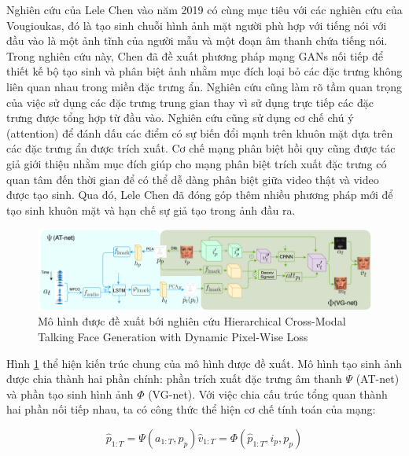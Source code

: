 Nghiên cứu của Lele Chen vào năm 2019 có cùng mục tiêu với các nghiên cứu của Vougioukas, đó là tạo sinh chuỗi hình ảnh mặt người phù hợp với tiếng nói với đầu vào là một ảnh tĩnh của người mẫu và một đoạn âm thanh chứa tiếng nói. Trong nghiên cứu này, Chen đã đề xuất phương pháp mạng GANs nối tiếp để thiết kế bộ tạo sinh và phân biệt ảnh nhằm mục đích loại bỏ các đặc trưng không liên quan nhau trong miền đặc trưng ẩn. Nghiên cứu cũng làm rõ tầm quan trọng của việc sử dụng các đặc trưng trung gian thay vì sử dụng trực tiếp các đặc trưng được tổng hợp từ đầu vào. Nghiên cứu cũng sử dụng cơ chế chú ý (attention) để đánh dấu các điểm có sự biến đổi mạnh trên khuôn mặt dựa trên các đặc trưng ẩn được trích xuất. Cơ chế mạng phân biệt hồi quy cũng được tác giả giới thiệu nhằm mục đích giúp cho mạng phân biệt trích xuất đặc trưng có quan tâm đến thời gian để có thể dễ dàng phân biệt giữa video thật và video được tạo sinh. Qua đó, Lele Chen đã đóng góp thêm nhiều phương pháp mới để tạo sinh khuôn mặt và hạn chế sự giả tạo trong ảnh đầu ra. 

\begin{figure}[H]
    \centering
    \includegraphics[width=15cm]{./content/images/chen2019_model.png}
    \caption{Mô hình được đề xuất bới nghiên cứu Hierarchical Cross-Modal Talking Face Generation with Dynamic Pixel-Wise Loss}
    \label{fig:chen2019_model}
\end{figure}

Hình \ref{fig:chen2019_model} thể hiện kiến trúc chung của mô hình được đề xuất. Mô hình tạo sinh ảnh được chia thành hai phần chính: phần trích xuất đặc trưng âm thanh $\Psi$ (AT-net) và phần tạo sinh hình ảnh $\Phi$ (VG-net). Với việc chia cấu trúc tổng quan thành hai phần nối tiếp nhau, ta có công thức thể hiện cơ chế tính toán của mạng:

\begin{subequations}
    \begin{equation}
        \hat{p}_{1:T} = \Psi(a_{1:T}, p_p)
    \end{equation}
    \begin{equation}
        \hat{v}_{1:T} = \Phi(\hat{p}_{1:T}, i_p, p_p)
    \end{equation}
\end{subequations}

